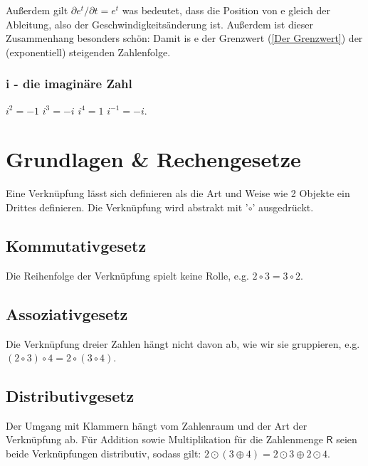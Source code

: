 \documentclass[letterpaper, titlepage]{article}
\begin{document}
\absatzformel
Außerdem gilt $\partial e^t/\partial t=e^t$ was bedeutet, dass die Position von e gleich der Ableitung, also der Geschwindigkeitsänderung ist. Außerdem ist dieser Zusammenhang  besonders schön: 
Damit is e der Grenzwert (\ref{Der Grenzwert}) der (exponentiell) steigenden Zahlenfolge.  

\subsubsection{i - die imaginäre Zahl}\label{i - die imaginäre Zahl}
\begin{center}
    
    $i^2=-1$
    \skiptwolines
    $i^3=-i$
    \skiptwolines
    $i^4=1$
    \skiptwolines
    $i^{-1}=-i$.
    \newline
\end{center}


\section{Grundlagen \& Rechengesetze}\label{Grundlegende Rechengesetze}
Eine Verknüpfung lässt sich definieren als die Art und Weise wie 2 Objekte ein Drittes definieren. Die Verknüpfung wird abstrakt mit '$\circ$' ausgedrückt.

\subsection{Kommutativgesetz}\label{Kommutativgesetz}
Die Reihenfolge der Verknüpfung spielt keine Rolle, e.g. $2\circ 3=3 \circ 2$. 

\subsection{Assoziativgesetz}\label{Assoziativgesetz}
Die Verknüpfung dreier Zahlen hängt nicht davon ab, wie wir sie gruppieren, e.g. $(2 \circ 3) \circ 4 = 2 \circ (3 \circ 4)$. 

\subsection{Distributivgesetz}\label{Distributivgesetz}
Der Umgang mit Klammern hängt vom Zahlenraum und der Art der Verknüpfung ab. Für Addition sowie Multiplikation für die Zahlenmenge $\mathsf{R}$ seien beide Verknüpfungen distributiv, sodass gilt: $2\odot (3\oplus 4)=2\odot 3\oplus 2\odot 4$. \hfill \break
\end{document}
